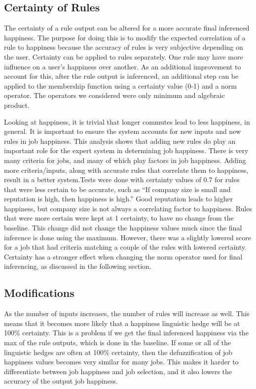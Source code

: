 \documentclass[12pt,fleqn,reqno,letterpaper]{article}
\begin{document}
\subsection{Certainty of Rules}
The certainty of a rule output can be altered for a more accurate final inferenced happiness. The purpose for doing this is to modify the expected correlation of a rule to happiness because the accuracy of rules is very subjective depending on the user. Certainty can be applied to rules separately. One rule may have more influence on a user’s happiness over another. As an additional improvement to account for this, after the rule output is inferenced, an additional step can be applied to the membership function using a certainty value (0-1) and a norm operator. The operators we considered were only minimum and algebraic product.

Looking at happiness, it is trivial that longer commutes lead to less happiness, in general. It is important to ensure the system accounts for new inputs and new rules in job happiness. This analysis shows that adding new rules do play an important role for the expert system in determining job happiness. There is very many criteria for jobs, and many of which play factors in job happiness. Adding more criteria/inputs, along with accurate rules that correlate them to happiness, result in a better system.Tests were done with certainty values of 0.7 for rules that were less certain to be accurate, such as “If company size is small and reputation is high, then happiness is high.” Good reputation leads to higher happiness, but company size is not always a correlating factor to happiness. Rules that were more certain were kept at 1 certainty, to have no change from the baseline. This change did not change the happiness values much since the final inference is done using the maximum. However, there was a slightly lowered score for a job that had criteria matching a couple of the rules with lowered certainty. Certainty has a stronger effect when changing the norm operator used for final inferencing, as discussed in the following section.

\subsection{Modifications}
As the number of inputs increases, the number of rules will increase as well. This means that it becomes more likely that a happiness linguistic hedge will be at 100\% certainty. This is a problem if we get the final inferenced happiness via the max of the rule outputs, which is done in the baseline. If some or all of the linguistic hedges are often at 100\% certainty, then the defuzzification of job happiness values becomes very similar for many jobs. This makes it harder to differentiate between job happiness and job selection, and it also lowers the accuracy of the output job happiness.
\end{document}
